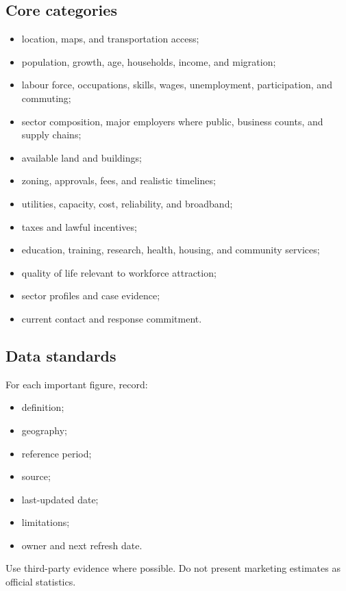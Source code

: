 \documentclass[11pt,letterpaper,oneside,openany]{book}
\begin{document}
\subsection[Core categories]{Core categories}
\begin{itemize}
\item location, maps, and transportation access;
\item population, growth, age, households, income, and migration;
\item labour force, occupations, skills, wages, unemployment, participation, and commuting;
\item sector composition, major employers where public, business counts, and supply chains;
\item available land and buildings;
\item zoning, approvals, fees, and realistic timelines;
\item utilities, capacity, cost, reliability, and broadband;
\item taxes and lawful incentives;
\item education, training, research, health, housing, and community services;
\item quality of life relevant to workforce attraction;
\item sector profiles and case evidence;
\item current contact and response commitment.
\end{itemize}


\subsection[Data standards]{Data standards}
For each important figure, record:


\begin{itemize}
\item definition;
\item geography;
\item reference period;
\item source;
\item last-updated date;
\item limitations;
\item owner and next refresh date.
\end{itemize}


Use third-party evidence where possible. Do not present marketing estimates as official statistics.


\end{document}
